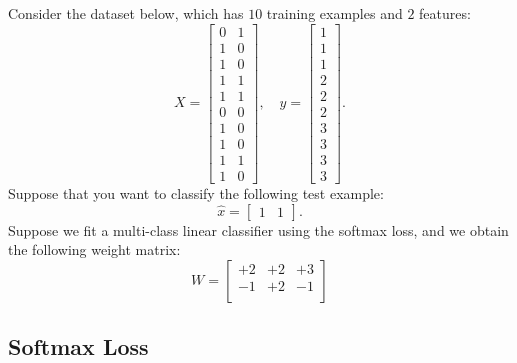 \documentclass{article}
\begin{document}
Consider the dataset below, which has $10$ training examples and $2$ features:
\[
X = \begin{bmatrix}0 & 1\\1 & 0\\ 1 & 0\\ 1 & 1\\ 1 & 1\\ 0 & 0\\  1 & 0\\  1 & 0\\  1 & 1\\  1 &0\end{bmatrix}, \quad y = \begin{bmatrix}1\\1\\1\\2\\2\\2\\3\\3\\3\\3\end{bmatrix}.
\]
Suppose that you want to classify the following test example:
\[
\hat{x} = \begin{bmatrix}1 & 1\end{bmatrix}.
\]
Suppose we fit a multi-class linear classifier using the softmax loss, and we obtain the following weight matrix:
\[
W = 
\begin{bmatrix}
+2 & +2 & +3\\
-1 & +2 & -1\\
\end{bmatrix}
\]


\subsection{Softmax Loss}
\end{document}
